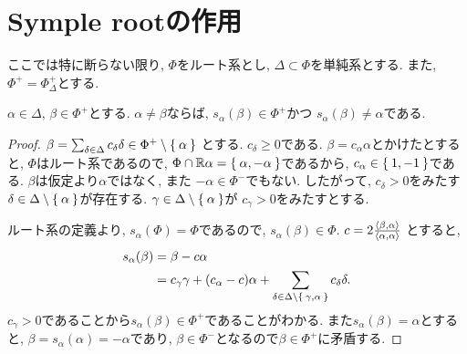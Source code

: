 \section{Symple rootの作用}
ここでは特に断らない限り,
$\Phi$をルート系とし, $\Delta\subset\Phi$を単純系とする.
また, $\Phi^+=\Phi_\Delta^+$とする.
\begin{prop}
  \label{prop:simple:reflect:positive2positive}
  $\alpha\in\Delta$, $\beta\in \Phi^+$とする.
  $\alpha\neq\beta$ならば,
  $s_\alpha(\beta)\in \Phi^+$かつ
  $s_\alpha(\beta)\neq \alpha$である.
\end{prop}
\begin{proof}
$\beta=\sum_{\delta\in\Delta}c_\delta\delta \in \Phi^+\setminus \Set{\alpha}$
とする. $c_\delta\geq 0$である.
$\beta=c_\alpha\alpha$とかけたとすると,
 $\Phi$はルート系であるので,
$\Phi\cap\mathbb{R}\alpha=\Set{\alpha,-\alpha}$であるから,
$c_\alpha\in\Set{1,-1}$である.
$\beta$は仮定より$\alpha$ではなく,
また $-\alpha\in \Phi^-$でもない.
したがって,
$c_{\delta}> 0$をみたす
$\delta\in\Delta\setminus\Set{\alpha}$が存在する.
$\gamma\in\Delta\setminus\Set{\alpha}$が
$c_{\gamma}> 0$をみたすとする.

ルート系の定義より,
$s_\alpha(\Phi)=\Phi$であるので,
$s_\alpha(\beta)\in \Phi$.
$c=2\frac{\Braket{\beta,\alpha}}{\Braket{\alpha,\alpha}}$
とすると,
\begin{align*}
  s_\alpha(\beta)&=\beta-c\alpha\\
  &=c_{\gamma}\gamma +(c_\alpha-c)\alpha + \sum_{\delta\in\Delta\setminus\Set{\gamma,\alpha}}c_\delta\delta.
\end{align*}
$c_\gamma>0$であることから$s_\alpha(\beta)\in\Phi^+$であることがわかる.
また$s_\alpha(\beta)=\alpha$とすると,
$\beta=s_\alpha(\alpha)=-\alpha$であり,
$\beta\in\Phi^-$となるので$\beta\in\Phi^+$に矛盾する.
\end{proof}

